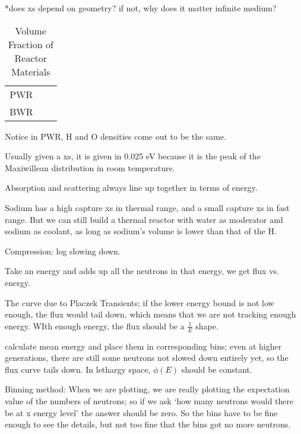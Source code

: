 \documentclass{school-22.211-notes}
\date{February 13, 2012}
\begin{document}
\maketitle

*does xs depend on geometry? if not, why does it matter infinite medium? 


\begin{table}
  \centering
  \begin{tabular}{|c|c|c|}
    PWR & & \\
    BWR & & 
  \end{tabular}
  \caption{Volume Fraction of Reactor Materials}
\end{table}
Notice in PWR, H and O densities come out to be the same. 

Usually given a xs, it is given in 0.025 eV because it is the peak of the Maxiwillean distribution in room temperature. 

Absorption and scattering always line up together in terms of energy. 

Sodium has a high capture xs in thermal range, and a small capture xs in fast range. But we can still build a thermal reactor with water as moderator and sodium as coolant, as long as sodium's volume is lower than that of the H. 

Compression: log slowing down. 

Take an energy and adds up all the neutrons in that energy, we get flux vs. energy. 

The curve due to Placzek Transients; if the lower energy bound is not low enough, the flux would tail down, which means that we are not tracking enough energy. WIth enough energy, the flux should be a $\frac{1}{E}$ shape. 

 calculate mean energy and place them in corresponding bins; even at higher generations, there are still some neutrons not slowed down entirely yet, so the flux curve tails down. In lethargy space, $\phi(E)$ should be constant. 

Binning method: When we are plotting, we are really plotting the expectation value of the numbers of neutrons; so if we ask `how many neutrons would there be at x energy level' the answer should be zero. So the bins have to be fine enough to see the details, but not too fine that the bins got no more neutrons. 
\end{document}
